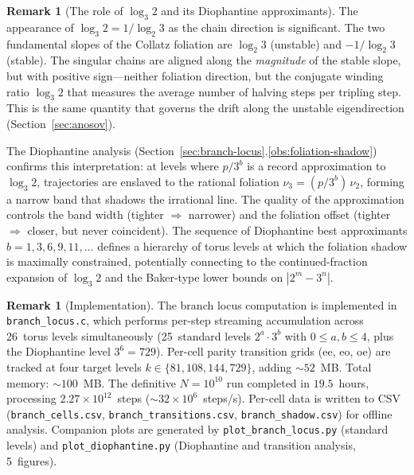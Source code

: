 \documentclass[11pt,a4paper]{article}
\theoremstyle{plain}
\theoremstyle{definition}
\newtheorem{remark}[theorem]{Remark}
\begin{document}
\begin{remark}[The role of $\log_3 2$ and its Diophantine approximants]
    The appearance of $\log_3 2 = 1/\log_2 3$ as the chain direction
    is significant.  The two fundamental slopes of the Collatz foliation
    are $\log_2 3$ (unstable) and $-1/\log_2 3$ (stable).  The singular
    chains are aligned along the \emph{magnitude} of the stable slope,
    but with positive sign---neither foliation direction, but the
    conjugate winding ratio $\log_3 2$ that measures the average number
    of halving steps per tripling step.  This is the same quantity that
    governs the drift along the unstable eigendirection
    (Section~\ref{sec:anosov}).

    The Diophantine analysis (Section~\ref{sec:branch-locus}.\ref{obs:foliation-shadow})
    confirms this interpretation: at levels where $p/3^b$ is a record
    approximation to $\log_3 2$, trajectories are enslaved to the
    rational foliation $\nu_3 = (p/3^b)\,\nu_2$, forming a narrow
    band that shadows the irrational line.  The quality of the
    approximation controls the band width (tighter $\Rightarrow$ narrower)
    and the foliation offset (tighter $\Rightarrow$ closer, but never
    coincident).  The sequence of Diophantine best approximants
    $b = 1, 3, 6, 9, 11, \ldots$ defines a hierarchy of torus
    levels at which the foliation shadow is maximally constrained,
    potentially connecting to the continued-fraction expansion of
    $\log_3 2$ and the Baker-type lower bounds on $|2^m - 3^n|$.
\end{remark}

\begin{remark}[Implementation]
    The branch locus computation is implemented in
    \texttt{branch\_locus.c}, which performs per-step streaming
    accumulation across 26~torus levels simultaneously (25~standard
    levels $2^a \cdot 3^b$ with $0 \leq a,b \leq 4$, plus the
    Diophantine level $3^6 = 729$).  Per-cell parity transition grids
    (ee, eo, oe) are tracked at four target levels
    $k \in \{81, 108, 144, 729\}$, adding ${\sim}52$~MB.  Total memory:
    ${\sim}100$~MB.  The definitive $N = 10^{10}$ run completed in
    $19.5$~hours, processing $2.27 \times 10^{12}$~steps
    (${\sim}32 \times 10^6$~steps/s).  Per-cell data is written to CSV
    (\texttt{branch\_cells.csv}, \texttt{branch\_transitions.csv},
    \texttt{branch\_shadow.csv}) for offline analysis.  Companion plots
    are generated by \texttt{plot\_branch\_locus.py} (standard levels)
    and \texttt{plot\_diophantine.py} (Diophantine and transition
    analysis, 5~figures).
\end{remark}
\end{document}
